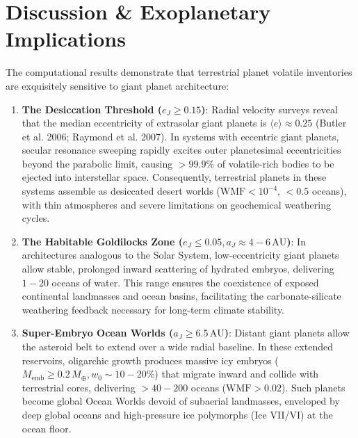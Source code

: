 \documentclass[11pt,a4paper]{article}
\begin{document}
\section{Discussion \& Exoplanetary Implications}
The computational results demonstrate that terrestrial planet volatile inventories are exquisitely sensitive to giant planet architecture:
\begin{enumerate}
    \item \textbf{The Desiccation Threshold ($e_J \ge 0.15$)}: Radial velocity surveys reveal that the median eccentricity of extrasolar giant planets is $\langle e \rangle \approx 0.25$ (Butler et al. 2006; Raymond et al. 2007). In systems with eccentric giant planets, secular resonance sweeping rapidly excites outer planetesimal eccentricities beyond the parabolic limit, causing $>99.9\%$ of volatile-rich bodies to be ejected into interstellar space. Consequently, terrestrial planets in these systems assemble as desiccated desert worlds ($\text{WMF} < 10^{-4}$, $<0.5$ oceans), with thin atmospheres and severe limitations on geochemical weathering cycles.
    \item \textbf{The Habitable Goldilocks Zone ($e_J \le 0.05, a_J \approx 4 - 6\,\text{AU}$)}: In architectures analogous to the Solar System, low-eccentricity giant planets allow stable, prolonged inward scattering of hydrated embryos, delivering $1 - 20$ oceans of water. This range ensures the coexistence of exposed continental landmasses and ocean basins, facilitating the carbonate-silicate weathering feedback necessary for long-term climate stability.
    \item \textbf{Super-Embryo Ocean Worlds ($a_J \ge 6.5\,\text{AU}$)}: Distant giant planets allow the asteroid belt to extend over a wide radial baseline. In these extended reservoirs, oligarchic growth produces massive icy embryos ($M_{\text{emb}} \ge 0.2\,M_\oplus, w_0 \sim 10 - 20\%$) that migrate inward and collide with terrestrial cores, delivering $>40 - 200$ oceans ($\text{WMF} > 0.02$). Such planets become global Ocean Worlds devoid of subaerial landmasses, enveloped by deep global oceans and high-pressure ice polymorphs (Ice VII/VI) at the ocean floor.
\end{enumerate}
\end{document}
